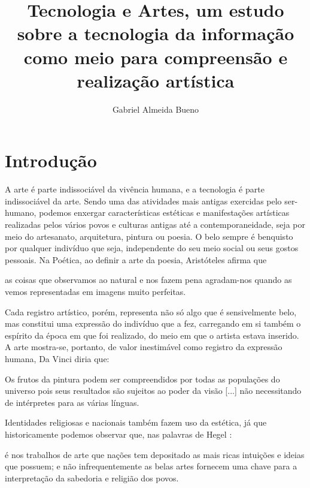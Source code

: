 \documentclass[12pt, a4paper, titlepage]{article}
\author{Gabriel Almeida Bueno}
\affil{FATEC Zona Sul}
\title{Tecnologia e Artes, um estudo sobre a tecnologia da informação como meio para compreensão e realização artística}
\begin{document}
\maketitle

\section{Introdução}
A arte é parte indissociável da vivência humana, e a tecnologia é parte indissociável da arte. 
Sendo uma das atividades mais antigas exercidas pelo ser-humano, podemos enxergar características estéticas e manifestações artísticas realizadas pelos vários povos e culturas antigas até a contemporaneidade, seja por meio do artesanato, arquitetura, pintura ou poesia.
O belo sempre é benquisto por qualquer indivíduo que seja, independente do seu meio social ou seus gostos pessoais.
Na Poética, ao definir a arte da poesia, Aristóteles \cite[p.42]{aristotle_poetics} afirma que 

\begin{displayquote}
as coisas que observamos ao natural e nos fazem pena agradam-nos quando as vemos representadas em imagens muito perfeitas.
\end{displayquote}

Cada registro artístico, porém, representa não só algo que é sensivelmente belo, mas constitui uma expressão do indivíduo que a fez, carregando em si
também o espírito da época em que foi realizado, do meio em que o artista estava inserido. 
A arte mostra-se, portanto, de valor inestimável como registro da expressão humana, Da Vinci \cite{davinci_thoughtsonart} diria que:

\begin{displayquote}
Os frutos da pintura podem ser compreendidos por todas as populações do universo pois seus resultados
são sujeitos ao poder da visão [...] não necessitando de intérpretes para as várias línguas.
\end{displayquote}

Identidades religiosas e nacionais também fazem uso da estética, já que historicamente podemos observar que, nas palavras de Hegel \cite{hegel}:

\begin{displayquote}
é nos trabalhos de arte que nações tem depositado as mais ricas intuições e ideias que possuem; e não 
infrequentemente as belas artes fornecem uma chave para a interpretação da sabedoria e religião dos povos.
\end{displayquote}
\end{document}

